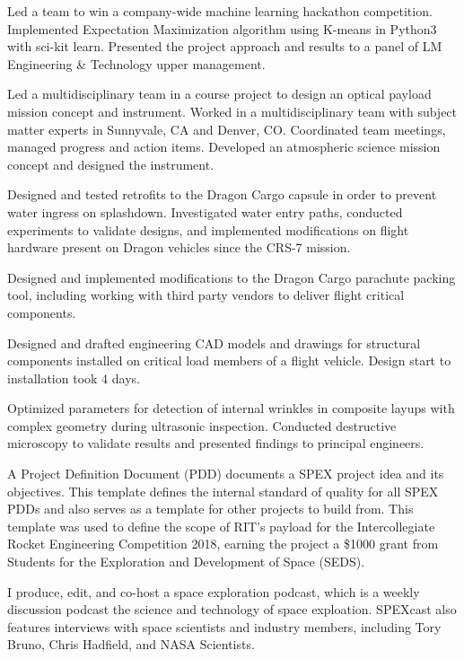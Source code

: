 \documentclass[10pt,final,sans]{resume}
\begin{document}
Led a team to win a company-wide machine learning hackathon competition. Implemented Expectation Maximization algorithm using K-means in Python3 with sci-kit learn. Presented the project approach and results to a panel of LM Engineering \& Technology upper management. 

Led a multidisciplinary team in a course project to design an optical payload mission concept and instrument. Worked in a multidisciplinary team with subject matter experts in Sunnyvale, CA and Denver, CO. Coordinated team meetings, managed progress and action items. Developed an atmospheric science mission concept and designed the instrument.

Designed and tested retrofits to the Dragon Cargo capsule in order to prevent water ingress on splashdown. Investigated water entry paths, conducted experiments to validate designs, and implemented modifications on flight hardware present on Dragon vehicles since the CRS-7 mission.

Designed and implemented modifications to the Dragon Cargo parachute packing tool, including working with third party vendors to deliver flight critical components.

Designed and drafted engineering CAD models and drawings for structural components installed on critical load members of a flight vehicle. Design start to installation took 4 days.

Optimized parameters for detection of internal wrinkles in composite layups with complex geometry during ultrasonic inspection. Conducted destructive microscopy to validate results and presented findings to principal engineers.

A Project Definition Document (PDD) documents a SPEX project idea and its objectives. This template defines the internal standard of quality for all SPEX PDDs and also serves as a template for other projects to build from. This template was used to define the scope of RIT's payload for the Intercollegiate Rocket Engineering Competition 2018, earning the project a \$1000 grant from Students for the Exploration and Development of Space (SEDS).

I produce, edit, and co-host a space exploration podcast, which is a weekly discussion podcast the science and technology of space exploation. SPEXcast also features interviews with space scientists and industry members, including Tory Bruno, Chris Hadfield, and NASA Scientists.
\end{document}
